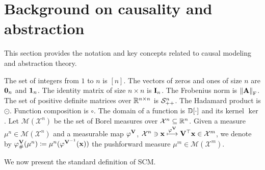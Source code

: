 \section{Background on causality and abstraction}\label{sec:preliminaries}

This section provides the notation and key concepts related to causal modeling and abstraction theory.

 The set of integers from $1$ to $n$ is $[n]$.
The vectors of zeros and ones of size $n$ are $\boldsymbol{0}_n$ and $\boldsymbol{1}_n$.
The identity matrix of size $n \times n$ is $\mathbf{I}_n$. The Frobenius norm is $\norm{\mathbf{A}}_{\mathrm{F}}$.
The set of positive definite matrices over $\mathbb{R}^{n\times n}$ is $\mathcal{S}_{++}^n$. The Hadamard product is $\odot$.
Function composition is $\circ$.
The domain of a function is $\mathbb{D}[\cdot]$ and its kernel $\ker$.
Let $\mathcal{M}(\mathcal{X}^n)$ be the set of Borel measures over $\mathcal{X}^n \subseteq \mathbb{R}^n$. Given a measure $\mu^n \in \mathcal{M}(\mathcal{X}^n)$ and a measurable map $\varphi^{\mathbf{V}}$, $\mathcal{X}^n \ni \mathbf{x} \overset{\varphi^{\mathbf{V}}}{\longmapsto} \mathbf{V}^\top \mathbf{x} \in \mathcal{X}^m$, we denote by $\varphi^{\mathbf{V}}_{\#}(\mu^n) \coloneqq \mu^n(\varphi^{\mathbf{V}^{-1}}(\mathbf{x}))$ the pushforward measure $\mu^m \in \mathcal{M}(\mathcal{X}^m)$. 


We now present the standard definition of SCM.

